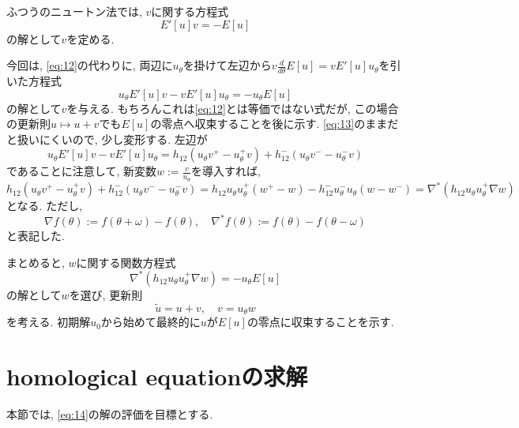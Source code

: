 \documentclass[a4paper]{ujarticle}
\numberwithin{equation}{section}
\theoremstyle{definition}
\begin{document}
        ふつうのニュートン法では, $v$に関する方程式
        \begin{equation} \label{eq:12}
            E'[u] v = - E[u]
        \end{equation}
        の解として$v$を定める.

        今回は, \eqref{eq:12}の代わりに, 両辺に$u_{\theta}$を掛けて左辺から$v \frac{d}{d \theta} E[u] = v E'[u] u_{\theta}$を引いた方程式
        \begin{equation} \label{eq:13}
            u_{\theta} E'[u] v - v E'[u] u_{\theta} = - u_{\theta} E[u]
        \end{equation}
        の解として$v$を与える. もちろんこれは\eqref{eq:12}とは等価ではない式だが, この場合の更新則$u \mapsto u + v$でも$E[u]$の零点へ収束することを後に示す.
        \eqref{eq:13}のままだと扱いにくいので, 少し変形する. 左辺が
        \[
            u_{\theta} E'[u] v - v E'[u] u_{\theta} = h_{12}(u_{\theta} v^{+} - u_{\theta}^{+} v) + h_{12}^{-}(u_{\theta} v^{-} - u_{\theta}^{-} v)
        \]
        であることに注意して, 新変数$w := \frac{v}{u_{\theta}}$を導入すれば, 
        \[
            h_{12}(u_{\theta} v^{+} - u_{\theta}^{+} v) + h_{12}^{-}(u_{\theta} v^{-} - u_{\theta}^{-} v) = h_{12} u_{\theta} u_{\theta}^{+}(w^{+} -  w) - h_{12}^{-} u^{-}_{\theta} u_{\theta} (w - w^{-}) = \nabla^{*}(h_{12} u_{\theta} u_{\theta}^{+} \nabla w )
        \]
        となる. ただし, 
        \[
            \nabla f(\theta) := f(\theta + \omega) - f(\theta), \quad \nabla^{*} f(\theta) := f(\theta) - f(\theta - \omega)
        \]
        と表記した.

        まとめると, $w$に関する関数方程式
        \begin{equation} \label{eq:14}
            \nabla^{*}(h_{12} u_{\theta} u_{\theta}^{+} \nabla w ) = - u_{\theta} E[u]
        \end{equation}
        の解として$w$を選び, 更新則
        \begin{equation} \label{eq:15}
            \tilde{u} = u + v, \quad v = u_{\theta} w
        \end{equation}
        を考える. 初期解$u_0$から始めて最終的に$u$が$E[u]$の零点に収束することを示す.

    \section{homological equationの求解}
        本節では, \eqref{eq:14}の解の評価を目標とする.
        
\end{document}
